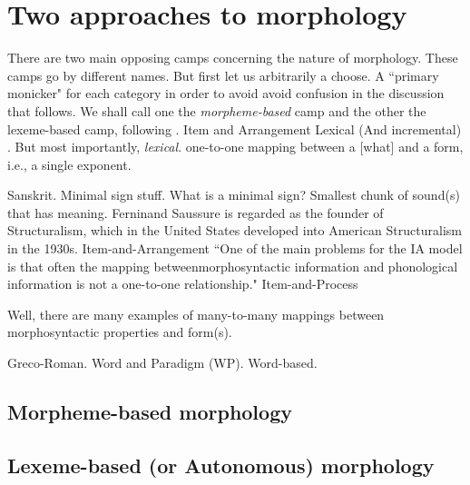 \section{Two approaches to morphology}
There are two main opposing camps concerning the nature of morphology. These camps go by different names. 
But first let us arbitrarily a choose. A ``primary monicker" for each category in order to avoid avoid confusion in the discussion that follows. 
We shall call one the \textit{morpheme-based} camp and the other the lexeme-based camp, following \cite{aronoff:1994}. Item and Arrangement
Lexical (And incremental) \citep{stump:2001}. But most importantly, \textit{lexical}.
one-to-one mapping between a [what] and a form, i.e., a single exponent.

Sanskrit. Minimal sign stuff. What is a minimal sign? Smallest chunk of sound(s) that has meaning.  Ferninand Saussure is regarded as the founder of Structuralism, which in the United States developed into American Structuralism in the 1930s.
Item-and-Arrangement ``One of the main problems for the IA model is that often the mapping betweenmorphosyntactic information and phonological information is not a one-to-one relationship." %
Item-and-Process

Well, there are many examples of many-to-many mappings between morphosyntactic properties and form(s). 

Greco-Roman. Word and Paradigm (WP). Word-based.



\subsection{Morpheme-based morphology}
\subsection{Lexeme-based (or Autonomous) morphology}

